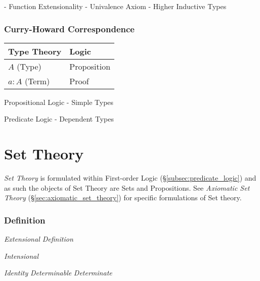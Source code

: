 \documentclass{article}
\begin{document}
- Function Extensionality
- Univalence Axiom
- Higher Inductive Types



\section{Curry-Howard Correspondence}\label{sec:curry_howard}

\begin{tabular}{| l | l |}
\hline
\textbf{Type Theory} & \textbf{Logic} \\ \hline \hline
$A$ (Type) & Proposition \\ \hline
$a : A$ (Term) & Proof \\
\hline
\end{tabular}

Propositional Logic - Simple Types

Predicate Logic - Dependent Types



\part{Set Theory}\label{sec:set_theory}

\emph{Set Theory} is formulated within First-order Logic
(\S\ref{subsec:predicate_logic}) and as such the objects of Set Theory
are Sets and Propositions. See \emph{Axiomatic Set Theory}
(\S\ref{sec:axiomatic_set_theory}) for specific formulations of Set
theory.



\section{Definition}\label{sec:set_definition}

\emph{Extensional Definition}

\emph{Intensional}

\emph{Identity} \emph{Determinable} \emph{Determinate}
\end{document}
